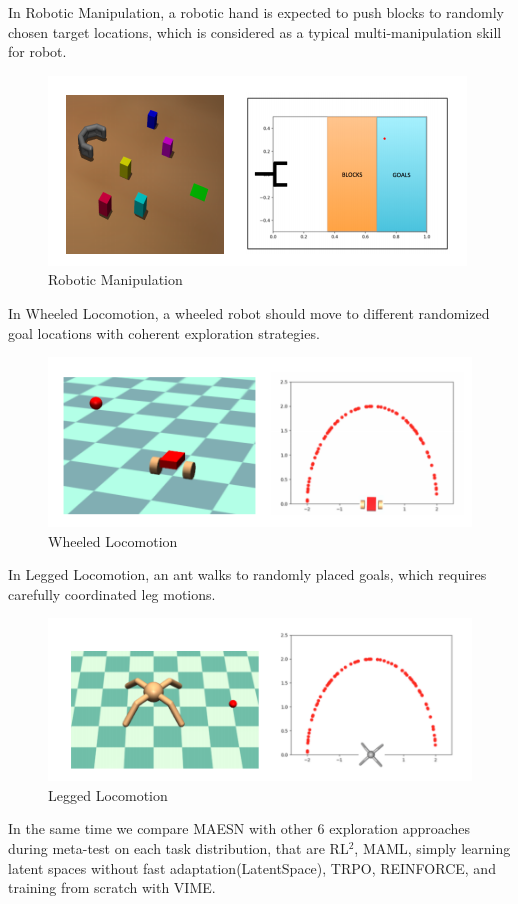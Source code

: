 In Robotic Manipulation, a robotic hand is expected to push blocks to randomly chosen target locations, which is considered as a typical multi-manipulation skill for robot.
\begin{figure}[H]
	\includegraphics[scale=0.6]{MAESN_05.PNG}
	\centering
	\caption{Robotic Manipulation}
	\label{MAESN}
\end{figure}

In Wheeled Locomotion, a wheeled robot should move to different randomized goal locations with coherent exploration strategies.
\begin{figure}[H]
	\includegraphics[scale=0.53]{MAESN_06.PNG}
	\centering
	\caption{Wheeled Locomotion}
	\label{MAESN}
\end{figure}

In Legged Locomotion, an ant walks to randomly placed goals, which requires carefully coordinated leg motions.
\begin{figure}[H]
	\includegraphics[scale=0.53]{MAESN_07.PNG}
	\centering
	\caption{Legged Locomotion}
	\label{MAESN}
\end{figure}
In the same time we compare MAESN with other 6 exploration approaches during meta-test on each task distribution, that are RL$^2$, MAML, simply learning latent spaces without fast adaptation(LatentSpace), TRPO, REINFORCE, and training from scratch with VIME. 

